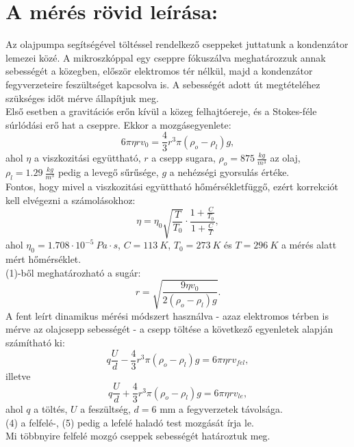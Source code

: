 \documentclass[a4paper]{article}
\begin{document}
\section{A mérés rövid leírása:}
Az olajpumpa segítségével töltéssel rendelkező cseppeket juttatunk a kondenzátor lemezei közé. A mikroszkóppal egy cseppre fókuszálva meghatározzuk annak sebességét a közegben, először elektromos tér nélkül, majd a kondenzátor fegyverzeteire feszültséget kapcsolva is. A sebességét adott út megtételéhez szükséges időt mérve állapítjuk meg. \\
Első esetben a gravitációs erőn kívül a közeg felhajtóereje, és a Stokes-féle súrlódási erő hat a cseppre. Ekkor a mozgásegyenlete:
\begin{equation}
6\pi \eta r v_0 = \frac{4}{3} r^3 \pi (\rho_o-\rho_l)g,
\end{equation}
ahol $\eta$ a viszkozitási együttható, $r$ a csepp sugara, $\rho_o=875\ \frac{kg}{m^3}$ az olaj, $\rho_l=1.29\ \frac{kg}{m^3}$ pedig a levegő sűrűsége, $g$ a nehézségi gyorsulás értéke. \\
Fontos, hogy mivel a viszkozitási együttható hőmérsékletfüggő, ezért korrekciót kell elvégezni a számolásokhoz:
\begin{equation}
\eta=\eta_0\sqrt{\frac{T}{T_0}}\cdot\frac{1+\frac{C}{T_0}}{1+\frac{C}{T}},
\end{equation}
ahol $\eta_0=1.708\cdot10^{-5}\ Pa\cdot s$, $C=113\ K$, $T_0=273\ K$ és $T=296\ K$ a mérés alatt mért hőmérséklet.
\\
(1)-ből meghatározható a sugár:
\begin{equation}
r=\sqrt{\frac{9 \eta v_0}{2 (\rho_o-\rho_l)g}}.
\end{equation} 
A fent leírt dinamikus mérési módszert használva - azaz elektromos térben is mérve az olajcsepp sebességét - a csepp töltése a következő egyenletek alapján számítható ki:
\begin{equation}
q\frac{U}{d}-\frac{4}{3} r^3 \pi (\rho _o - \rho _l) g=6 \pi \eta r v_{fel},
\end{equation}
illetve
\begin{equation}
q\frac{U}{d}+\frac{4}{3} r^3 \pi (\rho _o - \rho _l) g=6 \pi \eta r v_{le},
\end{equation}
ahol $q$ a töltés, $U$ a feszültség, $d=6\text{ mm}$ a fegyverzetek távolsága.\\
(4) a felfelé-, (5) pedig a lefelé haladó test mozgását írja le. 
\\
Mi többnyire felfelé mozgó cseppek sebességét határoztuk meg.
\end{document}
